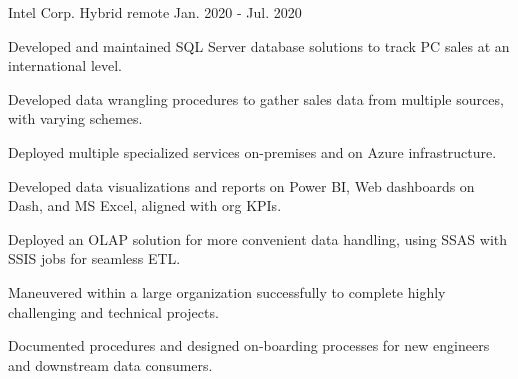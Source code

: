 \begin{cventries}
	{Intel Corp.} %
	{Hybrid remote} %
	{Jan. 2020 {-} Jul. 2020} %
	{
		\begin{cvitems}
			\item {Developed and maintained SQL Server database solutions to track PC sales at an international level.}
			\item {Developed data wrangling procedures to gather sales data from multiple sources, with varying schemes.}
			\item {Deployed multiple specialized services on-premises and on Azure infrastructure.}
			\item {Developed data visualizations and reports on Power BI, Web dashboards on Dash, and MS Excel, aligned with org KPIs.}
			\item {Deployed an OLAP solution for more convenient data handling, using SSAS with SSIS jobs for seamless ETL.}
			\item {Maneuvered within a large organization successfully to complete highly challenging and technical projects.}
			\item {Documented procedures and designed on-boarding processes for new engineers and downstream data consumers.}
		\end{cvitems}
	}
\end{cventries}
